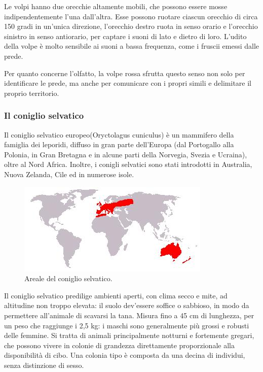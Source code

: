 \documentclass[11pt]{article}
\begin{document}
Le volpi hanno due orecchie altamente mobili, che possono essere mosse indipendentemente l'una dall'altra. Esse possono ruotare ciascun orecchio di circa 150 gradi in un'unica direzione, l'orecchio destro ruota in senso orario e l'orecchio sinistro in senso antiorario, per captare i suoni di lato e dietro di loro. L'udito della volpe è molto sensibile ai suoni a bassa frequenza, come i fruscii emessi dalle prede. 

Per quanto concerne l'olfatto, la volpe rossa sfrutta questo senso non solo per identificare le prede, ma anche per comunicare con i propri simili e delimitare il proprio territorio.



\subsubsection{Il coniglio selvatico}
\label{coniglio}
Il coniglio selvatico\cite{WikiConiglio} europeo(Oryctolagus cuniculus) è un mammifero della famiglia dei leporidi, diffuso in gran parte dell'Europa (dal Portogallo alla Polonia, in Gran Bretagna e in alcune parti della Norvegia, Svezia e Ucraina), oltre al Nord Africa. Inoltre, i conigli selvatici sono stati introdotti in  Australia, Nuova Zelanda, Cile ed in numerose isole. 

\begin{figure}[h]
    \centering
    \includegraphics[scale = 1]{ArealeDelConiglioSelvatico.jpeg}
    \caption{Areale del coniglio selvatico.}
    \label{figArealeConiglio}
\end{figure}

Il coniglio selvatico predilige ambienti aperti, con clima secco e mite, ad altitudine non troppo elevata: il suolo dev'essere soffice o sabbioso, in modo da permettere all'animale di scavarsi la tana. Misura fino a 45 cm di lunghezza, per un peso che raggiunge i 2,5 kg: i maschi sono generalmente più grossi e robusti delle femmine. Si tratta di animali principalmente notturni e fortemente gregari, che possono vivere in colonie di grandezza direttamente proporzionale alla disponibilità di cibo. Una colonia tipo è composta da una decina di individui, senza distinzione di sesso. 
\end{document}

